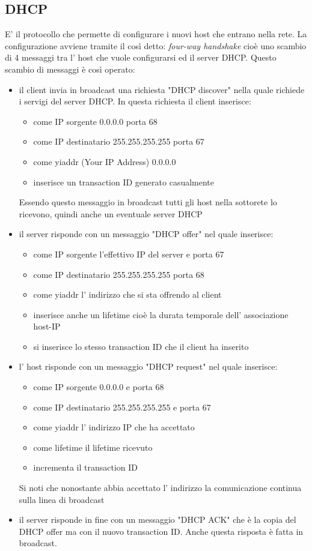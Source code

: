 \subsection{DHCP}
E' il protocollo che permette di configurare i nuovi host che entrano nella rete.
La configurazione avviene tramite il così detto: \emph{four-way handshake} cioè uno scambio di 4 messaggi tra l' host che vuole configurarsi ed il server DHCP.
Questo scambio di messaggi è così operato:
\begin{itemize}
    \item il client invia in broadcast una richiesta "DHCP discover" nella quale richiede i servigi del server DHCP.
    In questa richiesta il client inserisce:
    \begin{itemize}
        \item come IP sorgente 0.0.0.0 porta 68
        \item come IP destinatario 255.255.255.255 porta 67
        \item come yiaddr (Your IP Address) 0.0.0.0
        \item inserisce un transaction ID generato casualmente
    \end{itemize}
    Essendo questo messaggio in broadcast tutti gli host nella sottorete lo ricevono, quindi anche un eventuale server DHCP

    \item il server risponde con un messaggio "DHCP offer" nel quale inserisce:
    \begin{itemize}
        \item come IP sorgente l'effettivo IP del server e porta 67
        \item come IP destinatario 255.255.255.255 porta 68
        \item come yiaddr l' indirizzo che si sta offrendo al client
        \item inserisce anche un lifetime cioè la durata temporale dell' associazione host-IP
        \item si inserisce lo stesso transaction ID che il client ha inserito
    \end{itemize}
    
    \item l' host risponde con un messaggio "DHCP request" nel quale inserisce:
    \begin{itemize}
        \item come IP sorgente 0.0.0.0 e porta 68
        \item come IP destinatario 255.255.255.255 e porta 67
        \item come yiaddr l' indirizzo IP che ha accettato
        \item come lifetime il lifetime ricevuto
        \item incrementa il transaction ID
    \end{itemize}
    Si noti che nonostante abbia accettato l' indirizzo la comunicazione continua sulla linea di broadcast
    
    \item il server risponde in fine con un messaggio "DHCP ACK" che è la copia del DHCP offer ma con il nuovo transaction ID.
    Anche questa risposta è fatta in broadcast.
\end{itemize}

